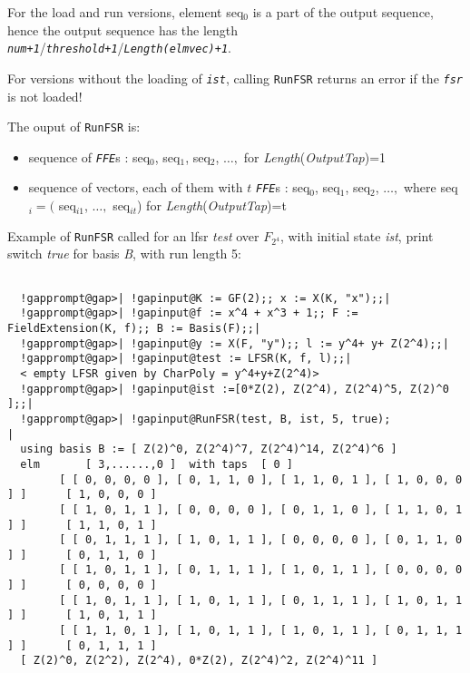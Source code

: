 \documentclass[a4paper,11pt]{report}
\begin{document}
{{{\begin{itemize}
\end{itemize}
 For the load and run versions, element seq$_0$ is a part of the output sequence, hence the output sequence has the length \mbox{\texttt{\mdseries\slshape num+1}}/\mbox{\texttt{\mdseries\slshape threshold+1}}/\mbox{\texttt{\mdseries\slshape Length(elmvec)+1}}. 

 For versions without the loading of \mbox{\texttt{\mdseries\slshape ist}}, calling \texttt{RunFSR} returns an error if the \mbox{\texttt{\mdseries\slshape fsr}} is not loaded!

 The ouput of \texttt{RunFSR} is: 
\begin{itemize}
\item  sequence of \mbox{\texttt{\mdseries\slshape FFE}}s : seq$_0$, seq$_1$, seq$_2$, $\dots ,$ for \emph{Length}(\emph{OutputTap})=1
\item  sequence of vectors, each of them with $t$ \mbox{\texttt{\mdseries\slshape FFE}}s : seq$_0$, seq$_1$, seq$_2$, $\dots ,$ where seq$_i=($ seq$_{i1}$, $\dots ,$ seq$_{it}$) for \emph{Length}(\emph{OutputTap})=t
\end{itemize}
 Example of \texttt{RunFSR} called for an lfsr \emph{test} over $F_{2^4}$, with initial state \emph{ist}, print switch \emph{true} for basis \emph{B}, with run length 5: 
\begin{Verbatim}[commandchars=!@|,fontsize=\small,frame=single,label=Example]
  
  !gapprompt@gap>| !gapinput@K := GF(2);; x := X(K, "x");;|
  !gapprompt@gap>| !gapinput@f := x^4 + x^3 + 1;; F := FieldExtension(K, f);; B := Basis(F);;|
  !gapprompt@gap>| !gapinput@y := X(F, "y");; l := y^4+ y+ Z(2^4);;|
  !gapprompt@gap>| !gapinput@test := LFSR(K, f, l);;|
  < empty LFSR given by CharPoly = y^4+y+Z(2^4)>
  !gapprompt@gap>| !gapinput@ist :=[0*Z(2), Z(2^4), Z(2^4)^5, Z(2)^0 ];;|
  !gapprompt@gap>| !gapinput@RunFSR(test, B, ist, 5, true);             |
  using basis B := [ Z(2)^0, Z(2^4)^7, Z(2^4)^14, Z(2^4)^6 ]	
  elm 		[ 3,......,0 ]  with taps  [ 0 ]
  		[ [ 0, 0, 0, 0 ], [ 0, 1, 1, 0 ], [ 1, 1, 0, 1 ], [ 1, 0, 0, 0 ] ]		[ 1, 0, 0, 0 ]
  		[ [ 1, 0, 1, 1 ], [ 0, 0, 0, 0 ], [ 0, 1, 1, 0 ], [ 1, 1, 0, 1 ] ]		[ 1, 1, 0, 1 ]
  		[ [ 0, 1, 1, 1 ], [ 1, 0, 1, 1 ], [ 0, 0, 0, 0 ], [ 0, 1, 1, 0 ] ]		[ 0, 1, 1, 0 ]
  		[ [ 1, 0, 1, 1 ], [ 0, 1, 1, 1 ], [ 1, 0, 1, 1 ], [ 0, 0, 0, 0 ] ]		[ 0, 0, 0, 0 ]
  		[ [ 1, 0, 1, 1 ], [ 1, 0, 1, 1 ], [ 0, 1, 1, 1 ], [ 1, 0, 1, 1 ] ]		[ 1, 0, 1, 1 ]
  		[ [ 1, 1, 0, 1 ], [ 1, 0, 1, 1 ], [ 1, 0, 1, 1 ], [ 0, 1, 1, 1 ] ]		[ 0, 1, 1, 1 ]
  [ Z(2)^0, Z(2^2), Z(2^4), 0*Z(2), Z(2^4)^2, Z(2^4)^11 ]
  

\end{Verbatim}}}}
\end{document}
